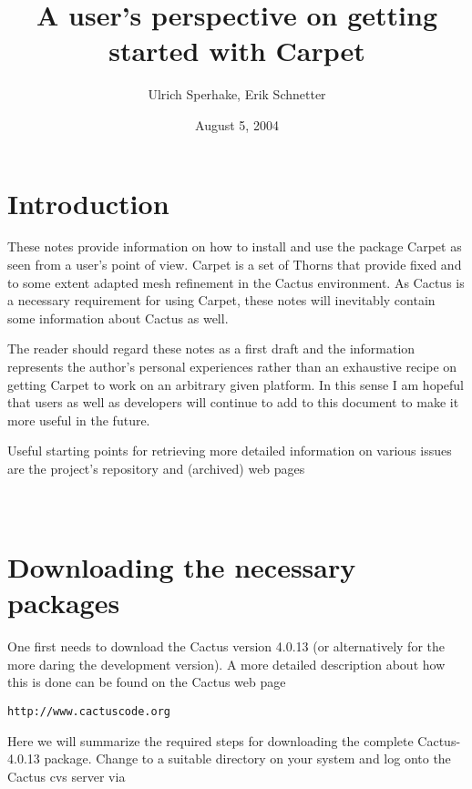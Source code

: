 \documentclass[11pt]{article}
\numberwithin{equation}{section}
\begin{document}
\title{A user's perspective on getting started with Carpet}
\author{Ulrich Sperhake, Erik Schnetter}
\date{August 5, 2004}
\maketitle



\section{Introduction}

These notes provide information on how to install and use the package
Carpet as seen from a user's point of view. Carpet is a set of Thorns
that provide fixed and to some extent adapted mesh refinement in
the Cactus environment. As Cactus is a necessary requirement for
using Carpet, these notes will inevitably contain some information about
Cactus as well.

The reader should regard these notes as a first draft and the information
represents the author's personal experiences rather than an exhaustive
recipe on getting Carpet to work on an arbitrary given platform. In this sense I
am hopeful that users as well as developers will continue to add to this
document to make it more useful in the future.

Useful starting points for retrieving more detailed information on
various issues are the project's repository and (archived) web pages\\

\hspace{1cm}{\tt https://bitbucket.org/eschnett/carpet.git}\\

\hspace{1cm}{\tt https://web.archive.org/web/20200924195200/https://carpetcode.org/}\\


\section{Downloading the necessary packages}

One first needs to download the Cactus version 4.0.13 (or
alternatively for the more daring the development version).
A more detailed description about how this is done can be found on the
Cactus web page
%
\begin{center}
  {\tt http://www.cactuscode.org}
\end{center}
%
Here we will summarize the required steps for downloading the complete
Cactus-4.0.13 package. Change to a suitable directory on your system
and log onto the Cactus cvs server via\\
\end{document}
